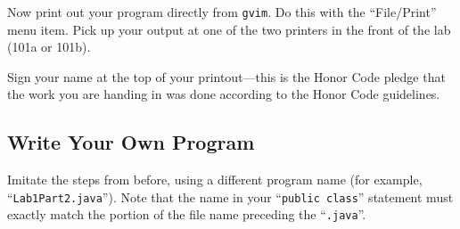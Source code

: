        Now print out your program
       directly from {\tt gvim}. Do this with the ``File/Print'' menu item. Pick up
       your output at one of the two printers in the front of the lab (101a or 101b).



       Sign your name at the top of your printout---this is the Honor Code pledge
       that the work you are handing in was done according to the Honor Code guidelines.

       \subsection*{Write Your Own Program}
       Imitate the steps from before, using a different program name (for
         example, ``{\tt Lab1Part2.java}''). Note that the name in your ``{\tt public
         class}'' statement must exactly match the portion of the file name
       preceding the ``{\tt .java}''.


